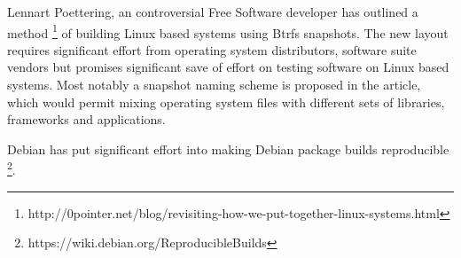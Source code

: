 \documentclass{article}
\begin{document}
Lennart Poettering, an controversial Free Software developer has outlined a method
\footnote{http://0pointer.net/blog/revisiting-how-we-put-together-linux-systems.html}
of building Linux based systems using Btrfs snapshots.
The new layout requires significant effort from operating system distributors,
software suite vendors but promises significant save of effort on testing
software on Linux based systems.
Most notably a snapshot naming scheme is proposed in the article,
which would permit mixing operating system files with different
sets of libraries, frameworks and applications.




Debian has put significant effort into making Debian package builds reproducible
\footnote{https://wiki.debian.org/ReproducibleBuilds}.





\end{document}
